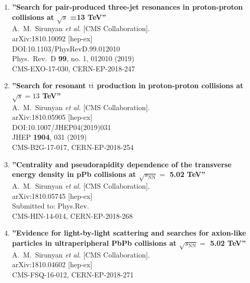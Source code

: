 \begin{enumerate}
\item%
{\bf ''Search for pair-produced three-jet resonances in proton-proton collisions at $\sqrt s$ =13  TeV''}
  \\{}A.~M.~Sirunyan {\it et al.} [CMS Collaboration].
  \\{}arXiv:1810.10092 [hep-ex]
  \\{}DOI:10.1103/PhysRevD.99.012010
  \\{}Phys.\ Rev.\ D {\bf 99}, no. 1, 012010 (2019)
  \\{}CMS-EXO-17-030, CERN-EP-2018-247

\item%
{\bf ''Search for resonant $ \mathrm{t}\overline{\mathrm{t}} $ production in proton-proton collisions at $ \sqrt{s}=13 $ TeV''}
  \\{}A.~M.~Sirunyan {\it et al.} [CMS Collaboration].
  \\{}arXiv:1810.05905 [hep-ex]
  \\{}DOI:10.1007/JHEP04(2019)031
  \\{}JHEP {\bf 1904}, 031 (2019)
  \\{}CMS-B2G-17-017, CERN-EP-2018-254

\item%
{\bf ''Centrality and pseudorapidity dependence of the transverse energy density in pPb collisions at $\sqrt{s_\mathrm{NN}}=$ 5.02 TeV''}
  \\{}A.~M.~Sirunyan {\it et al.} [CMS Collaboration].
  \\{}arXiv:1810.05745 [hep-ex]
  \\{}Submitted to: Phys.Rev.
  \\{}CMS-HIN-14-014, CERN-EP-2018-268

\item%
{\bf ''Evidence for light-by-light scattering and searches for axion-like particles in ultraperipheral PbPb collisions at $\sqrt{s_\mathrm{NN}} =$ 5.02 TeV''}
  \\{}A.~M.~Sirunyan {\it et al.} [CMS Collaboration].
  \\{}arXiv:1810.04602 [hep-ex]
  \\{}CMS-FSQ-16-012, CERN-EP-2018-271


\end{enumerate}

